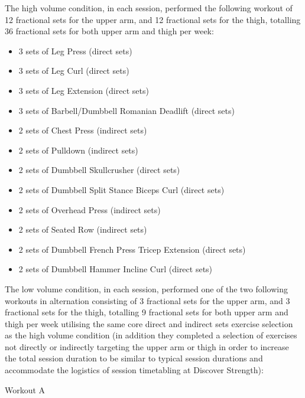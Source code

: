\documentclass[
]{article}
\providecommand{\tightlist}{%
  \setlength{\itemsep}{0pt}\setlength{\parskip}{0pt}}
\begin{document}
The high volume condition, in each session, performed the following
workout of 12 fractional sets for the upper arm, and 12 fractional sets
for the thigh, totalling 36 fractional sets for both upper arm and thigh
per week:

\begin{itemize}
\tightlist
\item
  3 sets of Leg Press (direct sets)
\item
  3 sets of Leg Curl (direct sets)
\item
  3 sets of Leg Extension (direct sets)
\item
  3 sets of Barbell/Dumbbell Romanian Deadlift (direct sets)
\item
  2 sets of Chest Press (indirect sets)
\item
  2 sets of Pulldown (indirect sets)
\item
  2 sets of Dumbbell Skullcrusher (direct sets)
\item
  2 sets of Dumbbell Split Stance Biceps Curl (direct sets)
\item
  2 sets of Overhead Press (indirect sets)
\item
  2 sets of Seated Row (indirect sets)
\item
  2 sets of Dumbbell French Press Tricep Extension (direct sets)
\item
  2 sets of Dumbbell Hammer Incline Curl (direct sets)
\end{itemize}

The low volume condition, in each session, performed one of the two
following workouts in alternation consisting of 3 fractional sets for
the upper arm, and 3 fractional sets for the thigh, totalling 9
fractional sets for both upper arm and thigh per week utilising the same
core direct and indirect sets exercise selection as the high volume
condition (in addition they completed a selection of exercises not
directly or indirectly targeting the upper arm or thigh in order to
increase the total session duration to be similar to typical session
durations and accommodate the logistics of session timetabling at
Discover Strength):

Workout A
\end{document}
